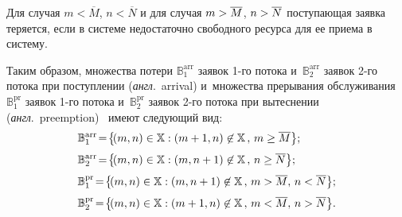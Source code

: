 \begin{multicols}{2}
  Для случая $m<\overline{M}$, $n<\overline{N}$ и для случая 
$m\hm>\overline{M}$, $n\hm>\overline{N}$ поступающая заявка теряется, 
если в системе недостаточно свободного ресурса для ее приема в систему.
  
  Таким образом, множества потери $\mathbb{B}_1^{\mathrm{arr}}$ заявок \mbox{1-го}
потока и~$\mathbb{B}_2^{\mathrm{arr}}$ заявок 2-го потока при поступлении 
(\textit{англ}.\ arrival) и~множества прерывания 
обслуживания~$\mathbb{B}_1^{\mathrm{pr}}$ заявок 1-го потока 
и~$\mathbb{B}_2^{\mathrm{pr}}$ заявок 2-го потока при вытеснении (\textit{англ}.\ 
preemption)~\cite{10-mos} имеют сле\-ду\-ющий вид:
  \begin{align*}
&  \mathbb{B}_1^{\mathrm{arr}}\!=\!\left\{\! (m,n)\in \mathbb{X}: 
(m+1,n)\not\in\mathbb{X}\,,\,m\geq \overline{M}\right\}\!;\\[3pt]
&  \mathbb{B}_2^{\mathrm{arr}}\!=\!\left\{\! (m,n)\in \mathbb{X}: 
(m, n+1)\not\in\mathbb{X}\,,\,n\geq \overline{N}\right\}\!;\\[3pt]
&  \mathbb{B}_1^{\mathrm{pr}}\!=\!\left\{\! (m,n)\in \mathbb{X}: 
(m,n+1)\not\in\mathbb{X}\,,\,m>\overline{M},\,n<\overline{N}\right\}\!;\\[3pt] \hspace*{-.3pt}
&\mathbb{B}_2^{\mathrm{pr}}\!=\!\left\{\! (m,n)\in \mathbb{X}: 
(m+1,n)\not\in\mathbb{X}\,,\,m<\overline{M},\,n>\overline{N}\right\}\!. \hspace*{-.3pt}
\end{align*}


\end{multicols}

